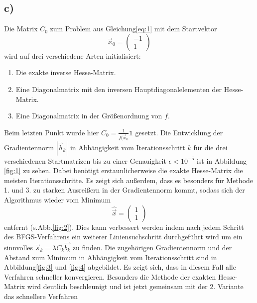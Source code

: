\subsection*{c)}
\label{sec:c}
Die Matrix $C_0$ zum Problem aus Gleichung\eqref{eq:1} mit dem Startvektor
\[
\vec{x}_0 = \begin{pmatrix}
-1\\
1
\end{pmatrix}
\]
wird auf drei verschiedene Arten initialisiert:
\begin{enumerate}
\item Die exakte inverse Hesse-Matrix.
\item Eine Diagonalmatrix mit den inversen Hauptdiagonalelementen der Hesse-Matrix.
\item Eine Diagonalmatrix in der Größenordnung von $f$.
\end{enumerate}
Beim letzten Punkt wurde hier $C_0 = \frac{1}{f(\vec{x}_0}\mathds{1}$ gesetzt.
Die Entwicklung der Gradientennorm $|\vec{b}_k|$ in Abhängigkeit vom Iterationsschritt $k$ für die drei verschiedenen Startmatrizen bis zu einer Genauigkeit $\epsilon < 10^{-5}$ ist in Abbildung \ref{fig:1} zu sehen. Dabei benötigt erstaunlicherweise die exakte Hesse-Matrix die meisten Iterationsschritte. Es zeigt sich außerdem, dass es besonders für Methode 1. und 3. zu starken Ausreißern in der Gradientennorm kommt, sodass sich der Algorithmus wieder vom Minimum 
\[
\hat{\vec{x}} = \begin{pmatrix}
1 \\
1
\end{pmatrix}
\]
entfernt (s.Abb.\ref{fig:2}).
Dies kann verbessert werden indem nach jedem Schritt des BFGS-Verfahrens ein weiterer Liniensuchschritt durchgeführt wird um ein sinnvolles $\vec{s}_k = \lambda C_k \vec{b_{k}}$ zu finden.
Die zugehörigen Gradientennorm und der Abstand zum Minimum in Abhängigkeit vom Iterationsschritt sind in Abbildung\ref{fig:3} und \ref{fig:4} abgebildet.
Es zeigt sich, dass in diesem Fall alle Verfahren schneller konvergieren. Besonders die Methode der exakten Hesse-Matrix wird deutlich beschleunigt und ist jetzt gemeinsam mit der 2. Variante das schnellere Verfahren

